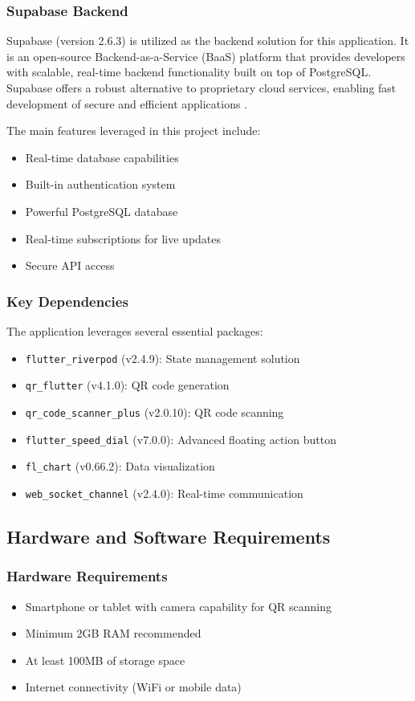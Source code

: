 \subsubsection{Supabase Backend}

Supabase (version 2.6.3) is utilized as the backend solution for this application. It is an open-source Backend-as-a-Service (BaaS) platform that provides developers with scalable, real-time backend functionality built on top of PostgreSQL. Supabase offers a robust alternative to proprietary cloud services, enabling fast development of secure and efficient applications \cite{SupabaseDocs2024}.

The main features leveraged in this project include:
\begin{itemize}
    \item Real-time database capabilities
    \item Built-in authentication system
    \item Powerful PostgreSQL database
    \item Real-time subscriptions for live updates
    \item Secure API access
\end{itemize}


\subsubsection{Key Dependencies}
The application leverages several essential packages:
\begin{itemize}
    \item \texttt{flutter\_riverpod} (v2.4.9): State management solution
    \item \texttt{qr\_flutter} (v4.1.0): QR code generation
    \item \texttt{qr\_code\_scanner\_plus} (v2.0.10): QR code scanning
    \item \texttt{flutter\_speed\_dial} (v7.0.0): Advanced floating action button
    \item \texttt{fl\_chart} (v0.66.2): Data visualization
    \item \texttt{web\_socket\_channel} (v2.4.0): Real-time communication
\end{itemize}

\subsection{Hardware and Software Requirements}

\subsubsection{Hardware Requirements}
\begin{itemize}
    \item Smartphone or tablet with camera capability for QR scanning
    \item Minimum 2GB RAM recommended
    \item At least 100MB of storage space
    \item Internet connectivity (WiFi or mobile data)
\end{itemize}

